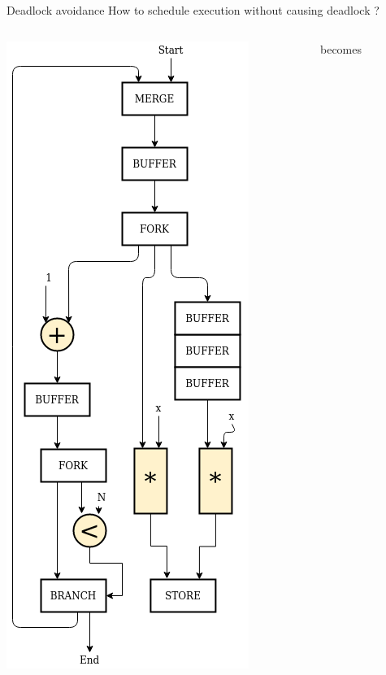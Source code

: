 \documentclass{beamer}
\begin{document}
\begin{frame}{Deadlock avoidance}
  How to schedule execution without causing deadlock ?
  \begin{columns}[T]
    \begin{column}{0.25\textwidth}
        \begin{center}
      \includegraphics[scale=0.25]{blocking_unshared.png}
    \end{center}
    \end{column}
    \begin{column}{0.1\textwidth}
    \begin{center}
        becomes
    \end{center}
    \end{column}

\end{columns}
\end{frame}
\end{document}
